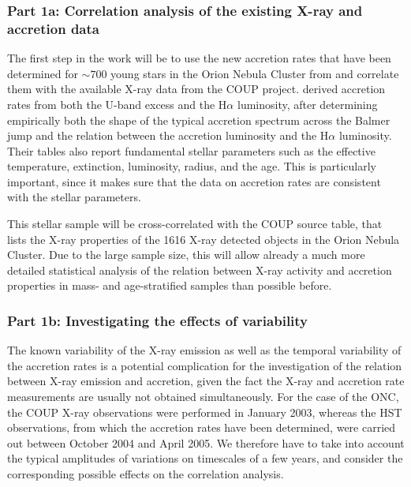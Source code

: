 \documentclass[10pt,fleqn,twoside]{article}
\newcommand{\Tcol}{\color{blue}}
\begin{document}
\subsubsection*{\Tcol Part 1a: Correlation analysis of the existing X-ray and accretion data}

The first step in the work will be to use the new accretion rates
that have been  determined for $\sim 700$ young stars
in the Orion Nebula Cluster from \citet{Manara12} and correlate them
with the available X-ray data from the COUP project.
%
\citet{Manara12} derived accretion rates from both the U-band excess and the H$\alpha$ luminosity,
after determining empirically both the shape of the typical accretion spectrum across the
Balmer jump and the relation between the accretion luminosity and the  
H$\alpha$ luminosity.
Their tables also report fundamental stellar parameters such as the
effective temperature, extinction, luminosity, radius, and the age. This is
particularly important, since it makes sure that the data on accretion rates are
consistent with the stellar parameters.

This stellar sample will be cross-correlated with the
COUP source table, that lists the X-ray properties of the 1616 X-ray detected objects
in the Orion Nebula Cluster. Due to the large sample size,
this will allow already a much more detailed statistical analysis of the relation between
X-ray activity and accretion properties in mass- and age-stratified samples
than possible before.



\subsubsection*{\Tcol Part 1b: Investigating the effects of variability}

The known variability of the X-ray emission as well as the 
temporal variability of the accretion rates is a potential 
complication  for the investigation of the relation between
X-ray emission and accretion, given the fact the X-ray and
accretion rate measurements are usually not obtained simultaneously.
For the case of the ONC, the COUP X-ray observations were performed 
in January 2003, whereas the HST observations, from which the accretion rates
have been determined, were carried out 
between October 2004 and April 2005.
%
We therefore have to take into account the typical amplitudes
of variations on timescales of a few years, and consider
the corresponding possible effects on the correlation analysis.
\end{document}

